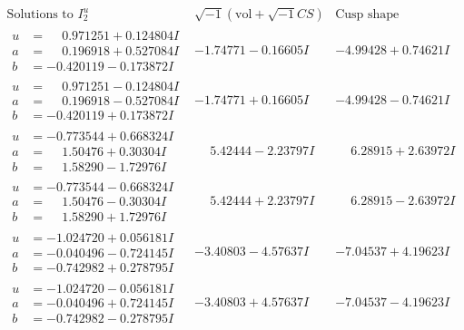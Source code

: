 \documentclass[1p]{elsarticle_modified}
\theoremstyle{definition}
\newcommand{\I}{\sqrt{-1}}
\begin{document}
$$\begin{array}{c|c|c}  
\text{Solutions to }I^u_{2}& \I (\text{vol} + \sqrt{-1}CS) & \text{Cusp shape}\\
 \hline 
\begin{aligned}
u &= \phantom{-}0.971251 + 0.124804 I \\
a &= \phantom{-}0.196918 + 0.527084 I \\
b &= -0.420119 - 0.173872 I\end{aligned}
 & -1.74771 - 0.16605 I & -4.99428 + 0.74621 I \\ \hline\begin{aligned}
u &= \phantom{-}0.971251 - 0.124804 I \\
a &= \phantom{-}0.196918 - 0.527084 I \\
b &= -0.420119 + 0.173872 I\end{aligned}
 & -1.74771 + 0.16605 I & -4.99428 - 0.74621 I \\ \hline\begin{aligned}
u &= -0.773544 + 0.668324 I \\
a &= \phantom{-}1.50476 + 0.30304 I \\
b &= \phantom{-}1.58290 - 1.72976 I\end{aligned}
 & \phantom{-}5.42444 - 2.23797 I & \phantom{-}6.28915 + 2.63972 I \\ \hline\begin{aligned}
u &= -0.773544 - 0.668324 I \\
a &= \phantom{-}1.50476 - 0.30304 I \\
b &= \phantom{-}1.58290 + 1.72976 I\end{aligned}
 & \phantom{-}5.42444 + 2.23797 I & \phantom{-}6.28915 - 2.63972 I \\ \hline\begin{aligned}
u &= -1.024720 + 0.056181 I \\
a &= -0.040496 - 0.724145 I \\
b &= -0.742982 + 0.278795 I\end{aligned}
 & -3.40803 - 4.57637 I & -7.04537 + 4.19623 I \\ \hline\begin{aligned}
u &= -1.024720 - 0.056181 I \\
a &= -0.040496 + 0.724145 I \\
b &= -0.742982 - 0.278795 I\end{aligned}
 & -3.40803 + 4.57637 I & -7.04537 - 4.19623 I \\ \hline\begin{aligned}

\end{aligned}
\end{array}$$
\end{document}
